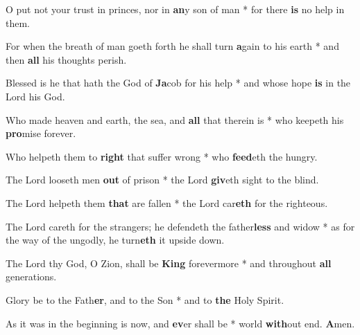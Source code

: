 \begin{multicols}{2}
	O put not your trust in princes, nor in \textbf{an}y son of man * for there \textbf{is} no help in them.
	
	For when the breath of man goeth forth he shall turn \textbf{a}gain to his earth * and then \textbf{all} his thoughts perish.
	
	Blessed is he that hath the God of \textbf{Ja}cob for his help * and whose hope \textbf{is} in the Lord his God.
	
	Who made heaven and earth, the sea, and \textbf{all} that therein is * who keepeth his \textbf{pro}mise forever.
	
	Who helpeth them to \textbf{right} that suffer wrong * who \textbf{feed}eth the hungry.
	
	The Lord looseth men \textbf{out} of prison * the Lord \textbf{giv}eth sight to the blind.
	
	The Lord helpeth them \textbf{that} are fallen * the Lord car\textbf{eth} for the righteous.
	
	The Lord careth for the strangers; he defendeth the father\textbf{less} and widow * as for the way of the ungodly, he turn\textbf{eth} it upside down.
	
	The Lord thy God, O Zion, shall be \textbf{King} forevermore * and throughout \textbf{all} generations.
	
	Glory be to the Fath\textbf{er}, and to the Son * and to \textbf{the} Holy Spirit.
	
	As it was in the beginning is now, and \textbf{ev}er shall be * world \textbf{with}out end. \textbf{A}men.
\end{multicols}